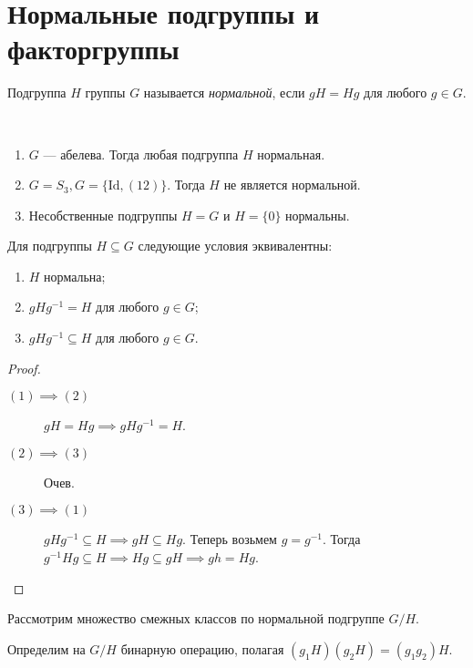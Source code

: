 \section{Нормальные подгруппы и факторгруппы}

\begin{definition}
    Подгруппа $H$ группы $G$ называется \textit{нормальной}, если $gH = Hg$ для любого $g \in G$.
\end{definition}

\begin{example}~
    \begin{enumerate}
    \item $G$ --- абелева. Тогда любая подгруппа $H$ нормальная.
    \item $G = S_3, G = \{\mathrm{Id}, (12)\}$. Тогда $H$ не является нормальной.
    \item Несобственные подгруппы $H = G$ и $H = \{0\}$ нормальны.
    \end{enumerate}
\end{example}

\begin{proposal}
    Для подгруппы $H \subseteq G$ следующие условия эквивалентны:
    \begin{enumerate}
    \item $H$ нормальна;
    \item $g H g^{-1} = H$ для любого $g \in G$;
    \item $g H g^{-1} \subseteq H$ для любого $g \in G$. 
    \end{enumerate}
\end{proposal}

\begin{proof}~
    \begin{description}
        \item[$(1) \implies (2)$] $gH = Hg \implies gHg^{-1} = H$.
        \item[$(2) \implies (3)$] Очев.
        \item[$(3) \implies (1)$] $gHg^{-1} \subseteq H \implies gH \subseteq Hg$. Теперь возьмем $g = g^{-1}$. Тогда $g^{-1} H g \subseteq H \implies Hg \subseteq gH \implies gh = Hg$.
            \qedhere
    \end{description}
\end{proof}

\bigskip
Рассмотрим множество смежных классов по нормальной подгруппе $G / H$.

Определим на $G / H$ бинарную операцию, полагая $(g_1 H)(g_2 H) = (g_1 g_2) H$.

